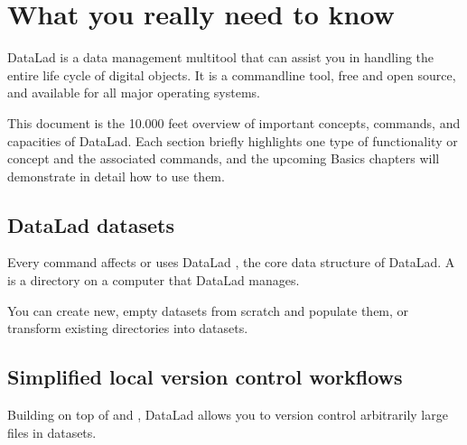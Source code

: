 \chapter{What you really need to know}
\label{\detokenize{intro/executive_summary:what-you-really-need-to-know}}\label{\detokenize{intro/executive_summary:executive-summary}}\label{\detokenize{intro/executive_summary:index-0}}\label{\detokenize{intro/executive_summary::doc}}
\sphinxAtStartPar
DataLad is a data management multitool that can assist you in handling the entire
life cycle of digital objects. It is a command\sphinxhyphen{}line tool, free and open source, and
available for all major operating systems.

\sphinxAtStartPar
This document is the 10.000 feet overview of important concepts, commands, and
capacities of DataLad. Each section briefly highlights one type of functionality or
concept and the associated commands, and the upcoming Basics chapters will demonstrate
in detail how to use them.


\section{DataLad datasets}
\label{\detokenize{intro/executive_summary:datalad-datasets}}
\sphinxAtStartPar
Every command affects or uses DataLad , the core data structure of
DataLad. A  is a directory on a computer that DataLad manages.

\begin{figure}[tbp]
\centering

\noindent{}
\end{figure}

\sphinxAtStartPar
You can create new, empty datasets from scratch and populate them,
or transform existing directories into datasets.


\section{Simplified local version control workflows}
\label{\detokenize{intro/executive_summary:simplified-local-version-control-workflows}}
\sphinxAtStartPar
Building on top of {\hyperref[\detokenize{glossary:term-Git}]{}} and {\hyperref[\detokenize{glossary:term-git-annex}]{}}, DataLad allows you to
version control arbitrarily large files in datasets.

